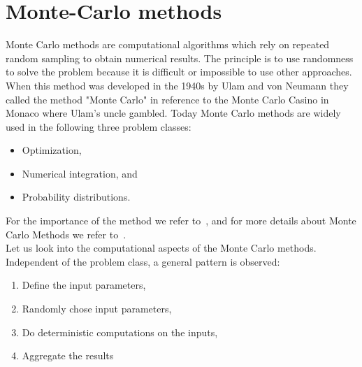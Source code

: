 %



\chapter{Monte-Carlo methods}
\label{sec:monte:carlo}
Monte Carlo methods are computational algorithms which rely on repeated random sampling to obtain numerical results. The principle is to use randomness to solve the problem because it is difficult or impossible to use other approaches. When this method was developed in the 1940s by Ulam and von Neumann they called the method "Monte Carlo" in reference to the Monte Carlo Casino in Monaco where Ulam's uncle gambled. Today Monte Carlo methods are widely used in the following three problem classes:
\begin{itemize}
\item Optimization,
\item Numerical integration, and
\item Probability distributions.
\end{itemize}
For the importance of the method we refer to~\cite{kroese2014monte}, and for more details about Monte Carlo Methods we refer to~\cite{shonkwiler2009explorations}.\\

Let us look into the computational aspects of the Monte Carlo methods. Independent of the problem class, a general pattern is observed:
\begin{enumerate}
\item Define the input parameters,
\item Randomly chose input parameters,
\item Do deterministic computations on the inputs,
\item Aggregate the results
\end{enumerate}

